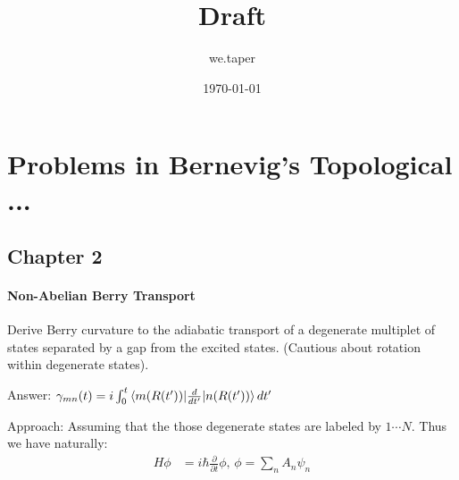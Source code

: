 \documentclass{article}
\title{Draft}
\date{\today}
\author{we.taper}
\begin{document}
\maketitle
{}
\tableofcontents

\section{Problems in Bernevig's Topological ...}

    \subsection{Chapter 2}
    \paragraph{Non-Abelian Berry Transport}
    Derive Berry curvature to the adiabatic transport of a degenerate
    multiplet of states separated by a gap from the excited states.
    (Cautious about rotation within degenerate states).

    Answer: $\gamma_{mn}(t) = i \int_0^t \braket{m(R(t'))|\frac{d}{dt'}|n(R(t'))}dt'$

    Approach:
    Assuming that the those degenerate states are labeled by $1\cdots N$. 
    Thus we have naturally:
	\begin{align}
            H\phi &=i\hbar\frac{\partial}{\partial t}\phi\text{,  }
        \phi = \sum_n A_n \psi_n
    \end{align}
    
\end{document}

